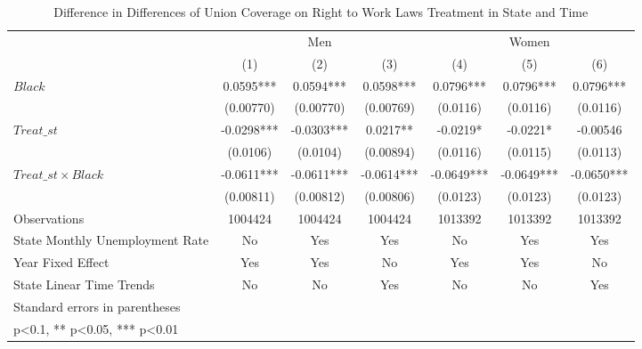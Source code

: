 \begin{table}[htbp]\centering
\def\sym#1{\ifmmode^{#1}\else\(^{#1}\)\fi}
\caption{Difference in Differences of Union Coverage on Right to Work Laws Treatment in State and Time}
\begin{tabular}{l*{6}{c}}
\hline\hline
                    &\multicolumn{3}{c}{Men}                        &\multicolumn{3}{c}{Women}                      \\\cmidrule(lr){2-4}\cmidrule(lr){5-7}
                    &\multicolumn{1}{c}{(1)}   &\multicolumn{1}{c}{(2)}   &\multicolumn{1}{c}{(3)}   &\multicolumn{1}{c}{(4)}   &\multicolumn{1}{c}{(5)}   &\multicolumn{1}{c}{(6)}   \\
\hline
$ Black $           &      0.0595***&      0.0594***&      0.0598***&      0.0796***&      0.0796***&      0.0796***\\
                    &   (0.00770)   &   (0.00770)   &   (0.00769)   &    (0.0116)   &    (0.0116)   &    (0.0116)   \\
[1em]
$ Treat\_{st} $      &     -0.0298***&     -0.0303***&      0.0217** &     -0.0219*  &     -0.0221*  &    -0.00546   \\
                    &    (0.0106)   &    (0.0104)   &   (0.00894)   &    (0.0116)   &    (0.0115)   &    (0.0113)   \\
[1em]
$ Treat\_{st} \times Black $&     -0.0611***&     -0.0611***&     -0.0614***&     -0.0649***&     -0.0649***&     -0.0650***\\
                    &   (0.00811)   &   (0.00812)   &   (0.00806)   &    (0.0123)   &    (0.0123)   &    (0.0123)   \\
\hline
Observations        &     1004424   &     1004424   &     1004424   &     1013392   &     1013392   &     1013392   \\
State Monthly Unemployment Rate&          No   &         Yes   &         Yes   &          No   &         Yes   &         Yes   \\
Year Fixed Effect   &         Yes   &         Yes   &          No   &         Yes   &         Yes   &          No   \\
State Linear Time Trends&          No   &          No   &         Yes   &          No   &          No   &         Yes   \\
\hline\hline
\multicolumn{7}{l}{\footnotesize Standard errors in parentheses}\\
\multicolumn{7}{l}{\footnotesize * p<0.1, ** p<0.05, *** p<0.01}\\
\end{tabular}
\end{table}
